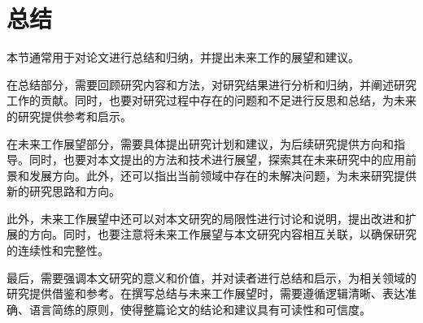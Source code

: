 \section{总结}\label{sec:conclusion}

本节通常用于对论文进行总结和归纳，并提出未来工作的展望和建议。

在总结部分，需要回顾研究内容和方法，对研究结果进行分析和归纳，并阐述研究工作的贡献。同时，也要对研究过程中存在的问题和不足进行反思和总结，为未来的研究提供参考和启示。

在未来工作展望部分，需要具体提出研究计划和建议，为后续研究提供方向和指导。同时，也要对本文提出的方法和技术进行展望，探索其在未来研究中的应用前景和发展方向。此外，还可以指出当前领域中存在的未解决问题，为未来研究提供新的研究思路和方向。

此外，未来工作展望中还可以对本文研究的局限性进行讨论和说明，提出改进和扩展的方向。同时，也要注意将未来工作展望与本文研究内容相互关联，以确保研究的连续性和完整性。

最后，需要强调本文研究的意义和价值，并对读者进行总结和启示，为相关领域的研究提供借鉴和参考。在撰写总结与未来工作展望时，需要遵循逻辑清晰、表达准确、语言简练的原则，使得整篇论文的结论和建议具有可读性和可信度。
